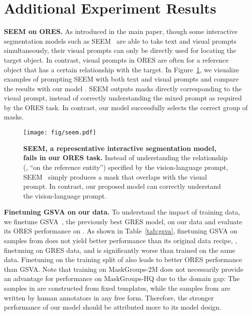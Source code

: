 \section{Additional Experiment Results}
\label{sec:supp-expr}

\noindent\textbf{SEEM on ORES.} As introduced in the main paper, though some interactive segmentation models such as SEEM~\cite{zou2024segment} are able to take text and visual prompts simultaneously, their visual prompts can only be directly used for locating the target object. In contrast, visual prompts in ORES are often for a reference object that has a certain relationship with the target. In Figure~\ref{fig:seem}, we visualize examples of prompting SEEM with both text and visual prompts and compare the results with our model \ourmodel. SEEM outputs masks directly corresponding to the visual prompt, instead of correctly understanding the mixed prompt as required by the ORES task. In contrast, our model \ourmodel successfully selects the correct group of masks.

\begin{figure}[th]
    \centering
    \texttt{[image: fig/seem.pdf]}
    \caption{\textbf{SEEM, a representative interactive segmentation model, fails in our ORES task.} Instead of understanding the relationship (\eg, ``on the reference entity'') specified by the vision-language prompt, SEEM~\cite{zou2024segment} simply produces a mask that overlaps with the visual prompt. In contrast, our proposed \ourmodel model can correctly understand the vision-language prompt.}
    \label{fig:seem}
\end{figure}

\noindent\textbf{Finetuning GSVA on our data.} To understand the impact of training data, we finetune GSVA~\cite{xia2024gsva}, the previously best GRES model, on our data and evaluate its ORES performance on \ourgooddata. As shown in Table~\ref{tab:gsva}, finetuning GSVA on samples from \ourlargedata does not yield better performance than its original data recipe, \ie, finetuning on GRES data, and is significantly worse than \ourmodel trained on the same data. Finetuning \ourmodel on the training split of \ourgooddata also leads to better ORES performance than GSVA. Note that training on MaskGroups-2M does not necessarily provide an advantage for performance on MaskGroups-HQ due to the domain gap: The samples in \ourlargedata are constructed from fixed templates, while the samples from \ourgooddata are written by human annotators in any free form. Therefore, the stronger performance of our model \ourmodel should be attributed more to its model design.

